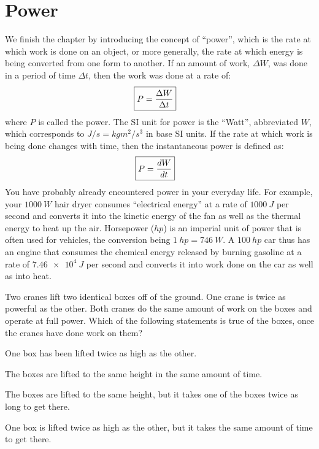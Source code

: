 \section{Power}
We finish the chapter by introducing the concept of ``power'', which is the rate at which work is done on an object, or more generally, the rate at which energy is being converted from one form to another. If an amount of work, $\Delta W$, was done in a period of time $\Delta t$, then the work was done at a rate of:
\begin{align}
\Aboxed{P = \frac{\Delta W}{\Delta t}}
\end{align}
where $P$ is called the power. The SI unit for power is the ``Watt'', abbreviated $\si{W}$, which corresponds to $\si{J/s}=\si{kg m^2/s^3}$ in base SI units. If the rate at which work is being done changes with time, then the instantaneous power is defined as:
\begin{align}
\Aboxed{P = \frac{dW}{dt}}
\end{align}
You have probably already encountered power in your everyday life. For example, your $\SI{1000}{W}$ hair dryer consumes ``electrical energy'' at a rate of $\SI{1000}{J}$ per second and converts it into the kinetic energy of the fan as well as the thermal energy to heat up the air. Horsepower ($\si{hp}$) is an imperial unit of power that is often used for vehicles, the conversion being $\SI{1}{hp} = \SI{746}{W}$. A $\SI{100}{hp}$ car thus has an engine that consumes the chemical energy released by burning gasoline at a rate of $\SI{7.46e4}{J}$ per second and converts it into work done on the car as well as into heat. 
\begin{checkpoint}
\begin{MCquestion}
{Two cranes lift two identical boxes off of the ground. One crane is twice as powerful as the other. Both cranes do the same amount of work on the boxes and operate at full power. Which of the following statements is true of the boxes, once the cranes have done work on them?}
\item One box has been lifted twice as high as the other.
\item The boxes are lifted to the same height in the same amount of time.
\item The boxes are lifted to the same height, but it takes one of the boxes twice as long to get there. \correct
\item One box is lifted twice as high as the other, but it takes the same amount of time to get there. 
\end{MCquestion}
\end{checkpoint}

